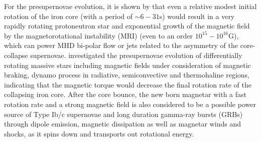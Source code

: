 \documentclass[fleqn,usenatbib]{mnras}
\begin{document}
For the presupernovae evolution, it is shown by \citet{akiyama2004magnetic} that even a relative modest initial rotation of the iron core (with a period of $\sim 6-31$s) would result in a very rapidly rotating protoneutron star and exponential growth of the magnetic field by the magnetorotational instability (MRI) (even to an order $10^{15}-10^{16}$G), which can power MHD bi-polar flow or jets related to the asymmetry of the core-collapse supernovae. \citet{heger2005presupernova} investigated the presupernovae evolution of differentially rotating massive stars including magnetic fields under consideration of magnetic braking, dynamo process in radiative, semiconvective and thermohaline regions, indicating that the magnetic torque would decrease the final rotation rate of the collapsing iron core. After the core bounce, the new born magnetar with a fast rotation rate and a strong magnetic field is also considered to be a possible power source of Type Ib/c supernovae \citep{Woosley2010,SNIc2013} and long duration gamma-ray bursts (GRBs) \citep{Metzger2011} through dipole emission, magnetic dissipation as well as magnetar winds and shocks, as it spins down and transports out rotational energy. 
\end{document}
